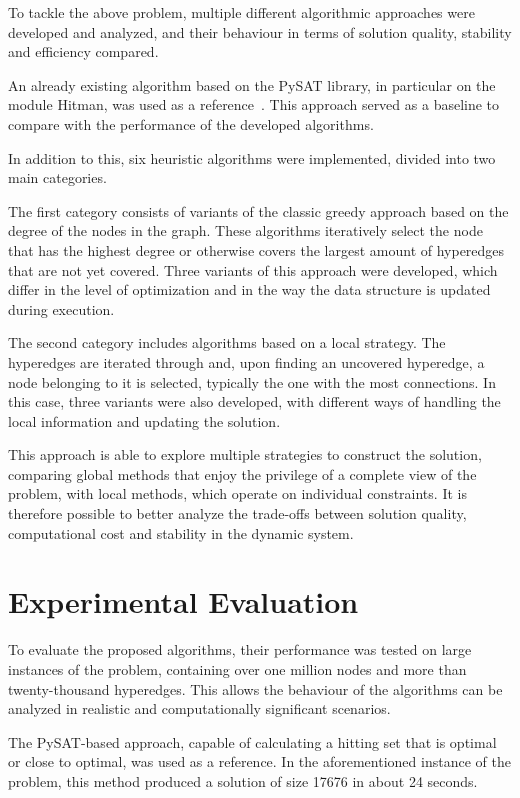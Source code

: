 \documentclass[11pt]{article}
\begin{document}
To tackle the above problem, multiple different algorithmic approaches were developed and analyzed, and their behaviour in terms of solution quality, stability and efficiency compared.

An already existing algorithm based on the PySAT library, in particular on the module Hitman, was used as a reference~\cite{biere2019}. This approach served as a baseline to compare with the performance of the developed algorithms.

In addition to this, six heuristic algorithms were implemented, divided into two main categories.

The first category consists of variants of the classic greedy approach based on the degree of the nodes in the graph. These algorithms iteratively select the node that has the highest degree or otherwise covers the largest amount of hyperedges that are not yet covered. Three variants of this approach were developed, which differ in the level of optimization and in the way the data structure is updated during execution.

The second category includes algorithms based on a local strategy. The hyperedges are iterated through and, upon finding an uncovered hyperedge, a node belonging to it is selected, typically the one with the most connections. In this case, three variants were also developed, with different ways of handling the local information and updating the solution.

This approach is able to explore multiple strategies to construct the solution, comparing global methods that enjoy the privilege of a complete view of the problem, with local methods, which operate on individual constraints. It is therefore possible to better analyze the trade-offs between solution quality, computational cost and stability in the dynamic system.

\section{Experimental Evaluation}

To evaluate the proposed algorithms, their performance was tested on large instances of the problem, containing over one million nodes and more than twenty-thousand hyperedges. This allows the behaviour of the algorithms can be analyzed in realistic and computationally significant scenarios.

The PySAT-based approach, capable of calculating a hitting set that is optimal or close to optimal, was used as a reference. In the aforementioned instance of the problem, this method produced a solution of size 17676 in about 24 seconds.
\end{document}

